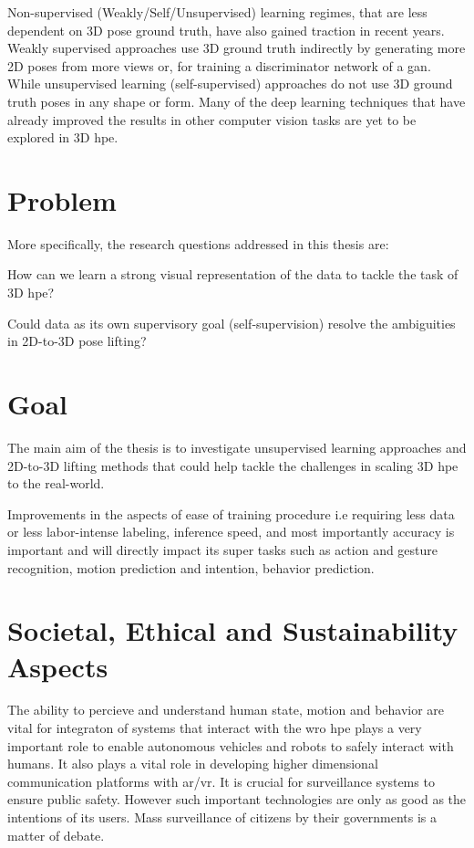 Non-supervised (Weakly/Self/Unsupervised) learning regimes, that are less dependent on 3D pose ground truth, have also gained traction in recent years. Weakly supervised approaches use 3D ground truth indirectly by generating more 2D poses from more views or, for training a discriminator network of a \ac{gan}. While unsupervised learning (self-supervised) approaches do not use 3D ground truth poses in any shape or form. Many of the deep learning techniques that have already improved the results in other computer vision tasks are yet to be explored in 3D \ac{hpe}. 

\section{Problem}
\label{sec:problem}
More specifically, the research questions addressed in this thesis are: 
\begin{compactenum}
\item How can we learn a strong visual representation of the data to tackle the task of 3D \ac{hpe}?
\item Could data as its own supervisory goal (self-supervision) resolve the ambiguities in 2D-to-3D pose lifting?
\end{compactenum}

\section{Goal}
\label{sec:goal}
The main aim of the thesis is to investigate unsupervised learning approaches and 2D-to-3D lifting methods that could help tackle the challenges in scaling 3D \ac{hpe} to the real-world.

Improvements in the aspects of ease of training procedure i.e requiring less data or less labor-intense labeling, inference speed, and most importantly accuracy is important and will directly impact its super tasks such as action and gesture recognition, motion prediction and intention, behavior prediction.

\section{Societal, Ethical and Sustainability Aspects}
The ability to percieve and understand human state, motion and behavior are vital for integraton of systems that interact with the wro 
\ac{hpe} plays a very important role to enable autonomous vehicles and robots to safely interact with humans. It also plays a vital role in developing higher dimensional communication platforms with \ac{ar/vr}. It is crucial for surveillance systems to ensure public safety. However such important technologies are only as good as the intentions of its users. Mass surveillance of citizens by their governments is a matter of debate.

